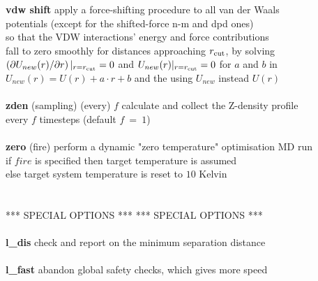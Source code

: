 \begin{tabbing}
\> {\bf vdw shift}                              \> apply a force-shifting procedure to all van der Waals \\
\>                                              \> potentials (except for the shifted-force n-m and dpd ones) \\
\>                                              \> so that the VDW interactions' energy and force contributions \\
\>                                              \> fall to zero smoothly for distances approaching $r_{\rm cut}$, by solving \\
\>                                              \> $\left(\partial U_{new}(r) / \partial r \right)|_{r = r_{\rm cut}} = 0$ and $U_{new}(r)|_{r=r_{\rm cut}}= 0$ for $a$ and $b$ in \\
\>                                              \> $U_{new}(r) = U(r) + a \cdot r + b$ and the using $U_{new}$ instead $U(r)$ \\
\>                                              \> \\
\> {\bf zden} (sampling) (every) $f$            \> calculate and collect the Z-density profile \\
\>                                              \> every $f$ timesteps (default $f~=~1$) \\
\>                                              \> \\
\> {\bf zero} (fire)                            \> perform a dynamic "zero temperature" optimisation MD run \\
\>                                              \> if $fire$ is specified then target temperature is assumed \\
\>                                              \> else target system temperature is reset to $10$ Kelvin \\
\>                                              \> \\
\>                                              \> \\
\> *** SPECIAL OPTIONS ***                      \> *** SPECIAL OPTIONS *** \\
\>                                              \> \\
\> {\bf l\_dis}                                 \> check and report on the minimum separation distance \\
\>                                              \> \\
\> {\bf l\_fast}                                \> abandon global safety checks, which gives more speed \\

\end{tabbing}
